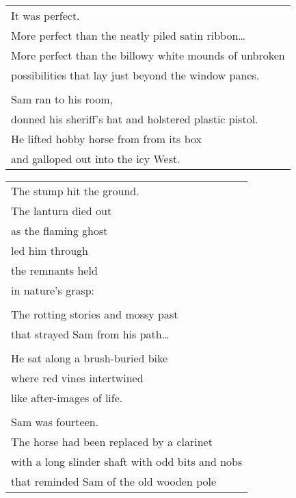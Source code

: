 \documentclass{article}
\begin{document}
\begin{center}
\begin{tabular}{l}
\hspace*{2ex}It was perfect. \\
\hspace*{2ex}More perfect than the neatly piled satin ribbon\ldots \\
\hspace*{2ex}More perfect than the billowy white mounds of unbroken \\
\hspace*{2ex}possibilities that lay just beyond the window panes. \\
\\
\hspace*{2ex}Sam ran to his room, \\
\hspace*{2ex}donned his sheriff's hat and holstered plastic pistol. \\
\hspace*{2ex}He lifted hobby horse from from its box \\
\hspace*{2ex}and galloped out into the icy West. \\
\end{tabular}
\begin{tabular}{l}
The stump hit the ground. \\
The lanturn died out \\
as the flaming ghost \\
led him through \\
the remnants held \\
in nature's grasp: \\
\\
The rotting stories and mossy past \\
that strayed Sam from his path\ldots \\
\\
He sat along a brush-buried bike \\
where red vines intertwined \\
like after-images of life. \\
\\
\hspace*{2ex}Sam was fourteen. \\
\hspace*{2ex}The horse had been replaced by a clarinet \\
\hspace*{2ex}with a long slinder shaft with odd bits and nobs \\
\hspace*{2ex}that reminded Sam of the old wooden pole \\

\end{tabular}
\end{center}
\end{document}
